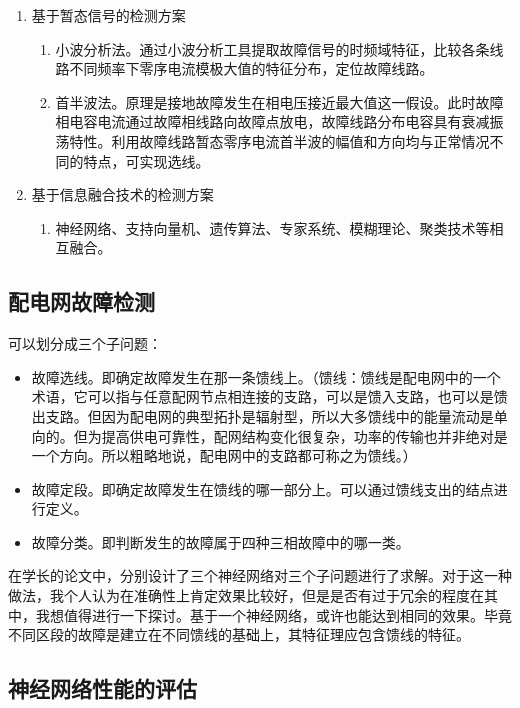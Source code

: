 \documentclass{article}
\begin{document}
{\begin{enumerate}
			\item 基于暂态信号的检测方案
			
			\begin{enumerate}
				\item 小波分析法。通过小波分析工具提取故障信号的时频域特征，比较各条线路不同频率下零序电流模极大值的特征分布，定位故障线路。
				\item 首半波法。原理是接地故障发生在相电压接近最大值这一假设。此时故障相电容电流通过故障相线路向故障点放电，故障线路分布电容具有衰减振荡特性。利用故障线路暂态零序电流首半波的幅值和方向均与正常情况不同的特点，可实现选线。
			\end{enumerate}
		
			\item 基于信息融合技术的检测方案
			
			\begin{enumerate}
				\item 神经网络、支持向量机、遗传算法、专家系统、模糊理论、聚类技术等相互融合。
			\end{enumerate}
		\end{enumerate}
	
	\subsection{配电网故障检测}
	
	可以划分成三个子问题：
	
	\begin{itemize}
		\item 故障选线。即确定故障发生在那一条馈线上。（馈线：馈线是配电网中的一个术语，它可以指与任意配网节点相连接的支路，可以是馈入支路，也可以是馈出支路。但因为配电网的典型拓扑是辐射型，所以大多馈线中的能量流动是单向的。但为提高供电可靠性，配网结构变化很复杂，功率的传输也并非绝对是一个方向。所以粗略地说，配电网中的支路都可称之为馈线。）
		\item 故障定段。即确定故障发生在馈线的哪一部分上。可以通过馈线支出的结点进行定义。
		\item 故障分类。即判断发生的故障属于四种三相故障中的哪一类。
	\end{itemize}

	在学长的论文中，分别设计了三个神经网络对三个子问题进行了求解。对于这一种做法，我个人认为在准确性上肯定效果比较好，但是是否有过于冗余的程度在其中，我想值得进行一下探讨。基于一个神经网络，或许也能达到相同的效果。毕竟不同区段的故障是建立在不同馈线的基础上，其特征理应包含馈线的特征。
	
	\subsection{神经网络性能的评估}
	
}
\end{document}
